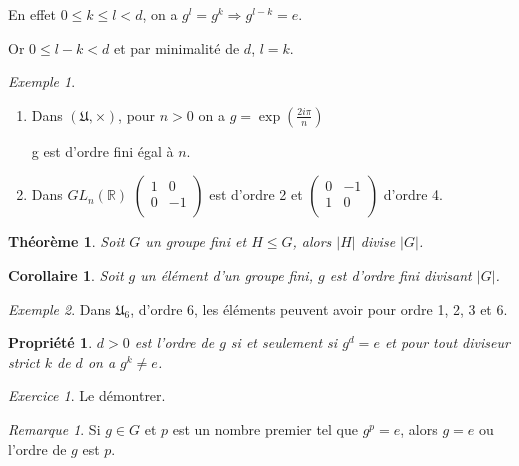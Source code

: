 \documentclass[]{article}
\newtheorem{mythm}{Théorème}
\newtheorem{myproperty}{Propriété}
\newtheorem{mycor}{Corollaire}
\theoremstyle{remark}
\newtheorem{myrem}{Remarque}
\newtheorem{myexer}{Exercice}
\newtheorem{myexmpl}{Exemple}
\theoremstyle{definition}
\begin{document}
En effet $0 \leqslant k \leqslant l < d$, on a $g^l=g^k \Longrightarrow g^{l-k}=e$.

Or $0 \leqslant l - k < d$ et par minimalité de $d$, $l=k$.

\begin{myexmpl}
	\leavevmode
	\begin{enumerate}
		\item Dans $(\mathfrak{U}, \times)$, pour $n > 0$ on a $g=\exp\left(\frac{2i \pi}{n}\right)$
		
		g est d'ordre fini égal à $n$.
		
		\item Dans $GL_n(\mathbb{R})$ $\left(\begin{array}{cc}
			1 & 0 \\
			0 & -1 \\
		\end{array}\right)$ est d'ordre 2 et $\left(\begin{array}{cc}
					0 & -1 \\
					1 & 0 \\
				\end{array}\right)$ d'ordre 4.
	\end{enumerate}
\end{myexmpl}

\begin{mythm}
	Soit $G$ un groupe fini et $H \leqslant G$, alors $|H|$ divise  $|G|$. 
\end{mythm}

\begin{mycor}
	Soit $g$ un élément d'un groupe fini, $g$ est d'ordre fini divisant $|G|$.
\end{mycor}

\begin{myexmpl}
	Dans $\mathfrak{U}_6$, d'ordre 6, les éléments peuvent avoir pour ordre 1, 2, 3 et 6.
\end{myexmpl}

\begin{myproperty}
	$d > 0$ est l'ordre de $g$ si et seulement si $g^d=e$ et pour tout diviseur strict $k$ de $d$ on a $g^k \neq e$.
\end{myproperty}

\begin{myexer}
	Le démontrer.
\end{myexer}

\begin{myrem}
	Si $g \in G$ et $p$ est un nombre premier tel que $g^p=e$, alors $g=e$ ou l'ordre de $g$ est $p$.
\end{myrem}
\end{document}

